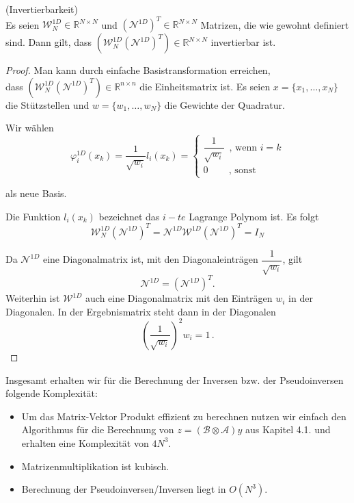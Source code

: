 \begin{Bemerkung} (Invertierbarkeit) \\ \label{bem:unit}
Es seien $\mathcal{W}_N^{1D} \in \mathbb{R}^{N \times N}$ und $(\mathcal{N}^{1D})^T \in \mathbb{R}^{N \times N}$ Matrizen, die wie gewohnt definiert sind. Dann gilt, dass $(\mathcal{W}_N^{1D} (\mathcal{N}^{1D})^T) \in \mathbb{R}^{N \times N}$ invertierbar ist.

\begin{proof}

Man kann durch einfache Basistransformation erreichen, \\ dass $(\mathcal{W}_N^{1D} (\mathcal{N}^{1D})^T) \in \mathbb{R}^{n \times n}$  die Einheitsmatrix ist. Es seien $x=\{x_1,\dots,x_N\}$ die Stützstellen und $w=\{w_1,\dots,w_N\}$ die Gewichte der Quadratur.

Wir wählen 
\begin{equation*}
\varphi^{1D}_i (x_k) = \dfrac{1}{ \sqrt{w_i} } l_i (x_k) = 
\begin{cases}
\dfrac{1}{ \sqrt{w_i} } \, \text{ , wenn } i=k  \\
0  \, \, \, \, \, \, \, \, \, \, \, \text{ , sonst }
\end{cases}
\end{equation*}

als neue Basis.

Die Funktion $l_i(x_k)$ bezeichnet das $i-te$ Lagrange Polynom ist.
Es folgt 
\begin{equation*}
\mathcal{W}_N^{1D} (\mathcal{N}^{1D})^T = \mathcal{N}^{1D} \mathcal{W}^{1D} (\mathcal{N}^{1D})^T = I_N
\end{equation*}

Da $\mathcal{N}^{1D}$ eine Diagonalmatrix ist, mit den Diagonaleinträgen $\dfrac{1}{ \sqrt{w_i} }$, gilt $$\mathcal{N}^{1D}=(\mathcal{N}^{1D})^T.$$ Weiterhin ist $\mathcal{W}^{1D}$ auch eine Diagonalmatrix mit den Einträgen $w_i$ in der Diagonalen. In der Ergebnismatrix steht dann in der Diagonalen 
\begin{equation*}
(\dfrac{1}{ \sqrt{w_i} })^2  w_i = 1 \, .
\end{equation*}
 
\end{proof}
\end{Bemerkung}
\newpage
Insgesamt erhalten wir für die Berechnung der Inversen bzw. der Pseudoinversen folgende Komplexität:
\begin{itemize}
\item Um das Matrix-Vektor Produkt effizient zu berechnen nutzen wir einfach den Algorithmus für die Berechnung von $z=(\mathcal{B} \otimes \mathcal{A})y$ aus Kapitel 4.1. und erhalten eine Komplexität von $4N^3$.

\item Matrizenmultiplikation ist kubisch.

\item Berechnung der Pseudoinversen/Inversen liegt in $O(N^3)$.

\end{itemize}

